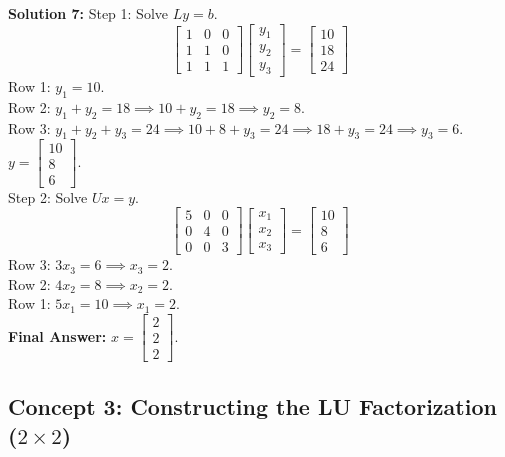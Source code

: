 \documentclass[11pt]{article}
\begin{document}
\vspace{0.5cm}
\textbf{Solution 7:}
Step 1: Solve $Ly = b$.
$$ \begin{bmatrix} 1 & 0 & 0 \\ 1 & 1 & 0 \\ 1 & 1 & 1 \end{bmatrix} \begin{bmatrix} y_1 \\ y_2 \\ y_3 \end{bmatrix} = \begin{bmatrix} 10 \\ 18 \\ 24 \end{bmatrix} $$
Row 1: $y_1 = 10$. \\
Row 2: $y_1 + y_2 = 18 \implies 10 + y_2 = 18 \implies y_2 = 8$. \\
Row 3: $y_1 + y_2 + y_3 = 24 \implies 10 + 8 + y_3 = 24 \implies 18 + y_3 = 24 \implies y_3 = 6$. \\
$y = \begin{bmatrix} 10 \\ 8 \\ 6 \end{bmatrix}$. \\
Step 2: Solve $Ux = y$.
$$ \begin{bmatrix} 5 & 0 & 0 \\ 0 & 4 & 0 \\ 0 & 0 & 3 \end{bmatrix} \begin{bmatrix} x_1 \\ x_2 \\ x_3 \end{bmatrix} = \begin{bmatrix} 10 \\ 8 \\ 6 \end{bmatrix} $$
Row 3: $3x_3 = 6 \implies x_3 = 2$. \\
Row 2: $4x_2 = 8 \implies x_2 = 2$. \\
Row 1: $5x_1 = 10 \implies x_1 = 2$. \\
\textbf{Final Answer:} $x = \begin{bmatrix} 2 \\ 2 \\ 2 \end{bmatrix}$.

\subsection*{Concept 3: Constructing the LU Factorization ($2 \times 2$)}
\end{document}
